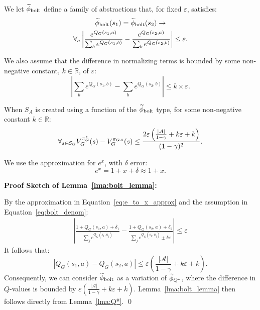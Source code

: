 \bdefn{$\epB$}
We let $\epB$ define a family of abstractions that, for fixed $\varepsilon$, satisfies:
\begin{multline}
\widetilde \phi_{\text{bolt}}(s_1) = \widetilde \phi_{\text{bolt}}(s_2) \rightarrow \\
\forall_{a} \left|\frac{e^{Q_G(s_1,a)}}{\sum_b e^{Q_G(s_1,b)}} - \frac{e^{Q_G(s_2,a)}}{\sum_b e^{Q_G(s_2,b)}}\right| \leq \varepsilon.
\label{eq:phi_bolt}
\end{multline}
\edefn

We also assume that the difference in normalizing terms is bounded by some non-negative constant, $k\in \mathbb{R}$, of $\varepsilon$:
\begin{equation}
\left| \sum_b e^{Q_G(s_1,b)} - \sum_b e^{Q_G(s_2,b)} \right| \leq k\times\varepsilon.
\label{eq:bolt_denom}
\end{equation}
\begin{lma} When $S_A$ is created using a function of the $\epB$ type, for some non-negative constant $k \in \mathbb{R}$:
\begin{equation}
\forall_{s \in \mathcal{S}_G} V_G^{\pi^*_G}(s) - V_G^{\pi_{GA}}(s) \leq \frac{2\varepsilon\left(\frac{|\mathcal{A}|}{1-\gamma} + k\varepsilon + k\right)}{(1-\gamma)^2}.
\end{equation}
\label{lma:bolt_lemma}
\end{lma}
We use the approximation for $e^x$, with $\delta$ error:
\begin{equation}
 e^x = 1 + x + \delta  \approx 1 + x.
\label{eq:e_to_x_approx}
\end{equation}

{\bf Proof Sketch of Lemma~\ref{lma:bolt_lemma}:}

By the approximation in Equation~\ref{eq:e_to_x_approx} and the assumption in Equation~\ref{eq:bolt_denom}:
\begin{align*}
\left|\frac{1 + Q_G(s_1,a) + \delta_1}{\sum_j e^{Q_G(s_1,a_j)}} - \frac{1 + Q_G(s_2,a) + \delta_2}{\sum_j e^{Q_G(s_1,a_j)} \pm k\varepsilon}\right| \leq \varepsilon
\end{align*}
It follows that:
\begin{equation}
\left|Q_G(s_1,a) - Q_G(s_2,a)\right| \leq \varepsilon \left(\frac{|\mathcal{A}|}{1-\gamma} + k\varepsilon + k \right).
\label{eq:bolt_qs}
\end{equation}
Consequently, we can consider $\epB$ as a variation of $\widetilde \phi_{Q^*}$, where the difference in $Q$-values is bounded by $\varepsilon \left(\frac{|\mathcal{A}|}{1-\gamma} + k\varepsilon + k \right)$. Lemma~\ref{lma:bolt_lemma} then follows directly from Lemma~\ref{lma:Q*}.
\qed

